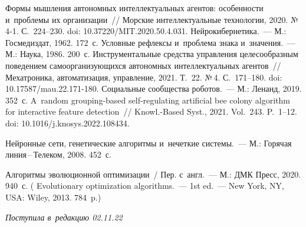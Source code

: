 \begin{multicols}{2}
{\small\frenchspacing
 {%
 \begin{thebibliography}{9}
   Формы мышления автономных интеллектуальных 
агентов: особенности и~проб\-ле\-мы их организации~// Морские интеллектуальные технологии, 
2020. №\,4-1. С.~224--230. doi: 10.37220/MIT.2020.50.4.031.
   Нейрокибернетика.~--- М.: 
Госмедиздат, 1962. 172~с.
   Условные рефлексы и~проб\-ле\-ма знака и~значения.~--- М.: Наука, 
1986. 200~с.
   Инструментальные средства управ\-ле\-ния 
целесообразным поведением са\-мо\-ор\-га\-ни\-зу\-ющих\-ся автономных интеллектуальных агентов~// 
Мехатроника, автоматизация, управ\-ле\-ние, 2021. Т.~22. №\,4. С.~171--180. doi: 
10.17587/mau.22.171-180.
   Социальные сообщества роботов.~--- 
М.: Ленанд, 2019. 352~с.
   A~random grouping-based self-regulating 
artificial bee colony algorithm for interactive feature detection~// Knowl.-Based Syst., 2021. 
Vol.~243. P.~1--12. doi: 10.1016/j.knosys.2022.108434.
  
   Нейронные сети, генетические 
алгоритмы и~нечеткие сис\-те\-мы.~--- М.: Горячая линия\,--\,Телеком, 2008. 452~с.

   Алгоритмы эволюционной оптимизации~/ Пер. с~англ.~--- М.: ДМК 
Пресс, 2020. 940~с. ( Evolutionary optimization algorithms.~--- 1st ed.~--- New 
York, NY, USA: Wiley, 2013. 784~p.)

\end{thebibliography}

 }
 }

\end{multicols}

\vspace*{-6pt}

\hfill{\small\textit{Поступила в~редакцию 02.11.22}}

\vspace*{8pt}




